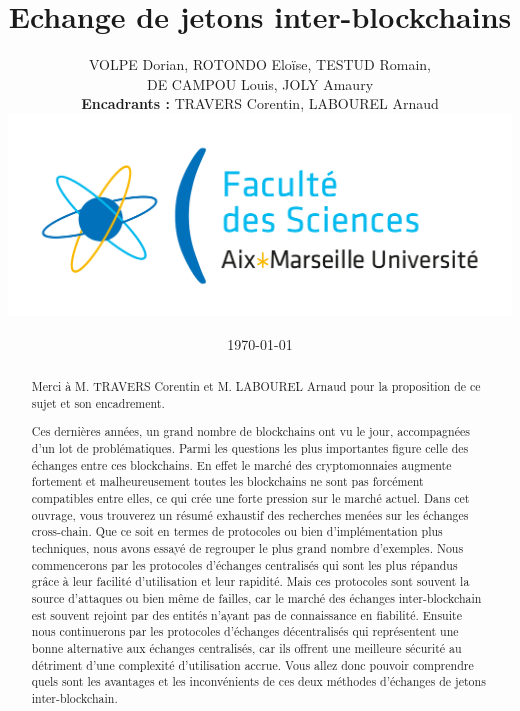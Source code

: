 \documentclass{article}
\newenvironment*{remerciements}{%
  \renewcommand*{\abstractname}{Remerciements}
  \begin{abstract}
}{
  \end{abstract}
}
\begin{document}
\title{Echange de jetons inter-blockchains}
\author{VOLPE Dorian, ROTONDO Eloïse, TESTUD Romain,\\DE CAMPOU Louis, JOLY Amaury  \\ \textbf{Encadrants :} TRAVERS Corentin, LABOUREL Arnaud \\ \includegraphics[scale=0.1]{./img/amu.png}}
\date{\today}

\begin{titlepage}
  \maketitle
\end{titlepage}

\begin{remerciements}
  Merci à M. TRAVERS Corentin et M. LABOUREL Arnaud pour la proposition de ce sujet et son encadrement.
\end{remerciements}
\begin{abstract}
  Ces dernières années, un grand nombre de blockchains ont vu le jour, accompagnées d’un lot de problématiques.
  Parmi les questions les plus importantes figure celle des échanges entre ces blockchains.
  En effet le marché des cryptomonnaies augmente fortement et malheureusement toutes les blockchains ne sont pas forcément compatibles entre elles, ce qui crée une forte pression sur le marché actuel.
  Dans cet ouvrage, vous trouverez un résumé exhaustif des recherches menées sur les échanges cross-chain.
  Que ce soit en termes de protocoles ou bien d'implémentation plus techniques, nous avons essayé de regrouper le plus grand nombre d'exemples.
  Nous commencerons par les protocoles d’échanges centralisés qui sont les plus répandus grâce à leur facilité d'utilisation et leur rapidité.
  Mais ces protocoles sont souvent la source d'attaques ou bien même de failles, car le marché des échanges inter-blockchain est souvent rejoint par des entités n'ayant pas de connaissance en fiabilité.
  Ensuite nous continuerons par les protocoles d'échanges décentralisés qui représentent une bonne alternative aux échanges centralisés, car ils offrent une meilleure sécurité au détriment d'une complexité d'utilisation accrue.
  Vous allez donc pouvoir comprendre quels sont les avantages et les inconvénients de ces deux méthodes d'échanges de jetons inter-blockchain.
\end{abstract}
\end{document}
